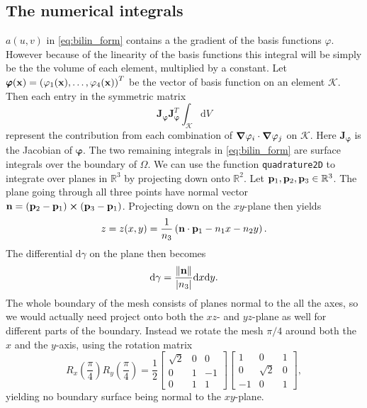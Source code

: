 \subsection{The numerical integrals}
$a(u,v)$ in \eqref{eq:bilin_form} contains a the gradient of the basis functions $\varphi$. However because of the linearity of the basis functions this integral will be simply be the the volume of each element, multiplied by a constant. Let $\pmb{\varphi}(\vb{x}) = \left(\varphi_1(\vb{x}),\dots,\varphi_4(\vb{x})\right)^T$ be the vector of basis function on an element $\mathcal{K}$. Then each entry in the symmetric matrix
\begin{equation}
    \pmb{J}_{\pmb{\varphi}}^{\phantom{}} \pmb{J}_{\pmb{\varphi}}^T\int_\mathcal{K} \! \mathrm{d}V
\end{equation}
represent the contribution from each combination of $\grad{\varphi_i}\cdot\grad{\varphi_j}$ on $\mathcal{K}$. Here $\pmb{J}_{\pmb{\varphi}}$ is the Jacobian of $\pmb{\varphi}$. The two remaining integrals in \eqref{eq:bilin_form} are surface integrals over the boundary of $\Omega$. We can use the function \texttt{quadrature2D} to integrate over planes in $\mathbb{R}^3$ by projecting down onto $\mathbb{R}^2$. Let $\vb{p}_1,\vb{p}_2,\vb{p}_3 \in \mathbb{R}^3$. The plane going through all three points have normal vector $\vb{n} = (\vb{p}_2-\vb{p}_1)\cross (\vb{p}_3-\vb{p}_1)$. Projecting down on the $xy$-plane then yields
\begin{equation}
    z = z(x,y)=\frac{1}{n_3}\left(\vb{n}\cdot \vb{p}_1-n_1x-n_2y\right).
\end{equation}
The differential $\mathrm{d}\gamma$ on the plane then becomes
\begin{equation}
    \mathrm{d}\gamma = \frac{\norm{\vb{n}}}{\abs{n_3}}\mathrm{d}x\mathrm{d}y.
\end{equation}
The whole boundary of the mesh consists of planes normal to the all the axes, so we would actually need project onto both the $xz$- and $yz$-plane as well for different parts of the boundary. Instead we rotate the mesh $\pi/4$ around both the $x$ and the $y$-axis, using the rotation matrix
\begin{equation}
    R_x\left(\frac{\pi}{4}\right)R_y\left(\frac{\pi}{4}\right) = \frac{1}{2}
    \begin{bmatrix}
        \sqrt{2} & 0 & 0 \\
        0 & 1 & -1 \\
        0 & 1 & 1
     \end{bmatrix}
     \begin{bmatrix}
        1 & 0 & 1 \\
        0 & \sqrt{2} & 0 \\
        -1 & 0 & 1
     \end{bmatrix},
\end{equation}
yielding no boundary surface being normal to the $xy$-plane.

